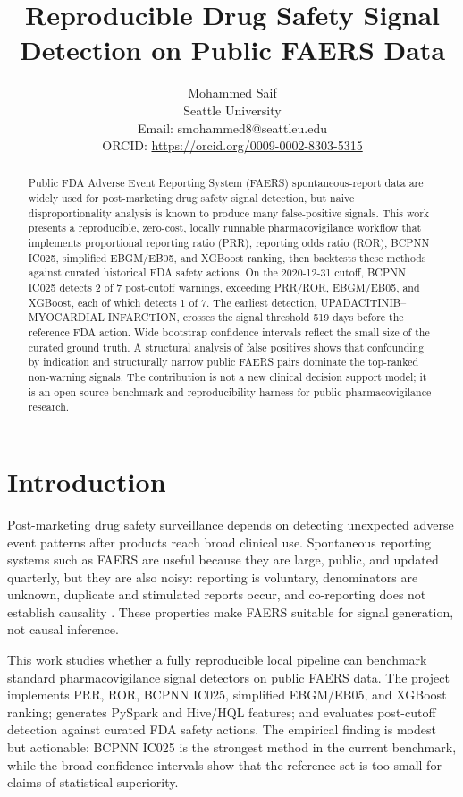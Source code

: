 \documentclass[12pt,onecolumn]{IEEEtran}
\title{Reproducible Drug Safety Signal Detection on Public FAERS Data}
\author{Mohammed Saif\\
Seattle University\\
Email: smohammed8@seattleu.edu\\
ORCID: \url{https://orcid.org/0009-0002-8303-5315}}
\begin{document}
\maketitle

\begin{abstract}
Public FDA Adverse Event Reporting System (FAERS) spontaneous-report data are
widely used for post-marketing drug safety signal detection, but naive
disproportionality analysis is known to produce many false-positive signals.
This work presents a reproducible, zero-cost, locally runnable
pharmacovigilance workflow that implements proportional reporting ratio (PRR),
reporting odds ratio (ROR), BCPNN IC025, simplified EBGM/EB05, and XGBoost
ranking, then backtests these methods against curated historical FDA safety
actions. On the 2020-12-31 cutoff, BCPNN IC025 detects 2 of 7 post-cutoff
warnings, exceeding PRR/ROR, EBGM/EB05, and XGBoost, each of which detects 1 of
7. The earliest detection, UPADACITINIB--MYOCARDIAL INFARCTION, crosses the
signal threshold 519 days before the reference FDA action. Wide bootstrap
confidence intervals reflect the small size of the curated ground truth. A
structural analysis of false positives shows that confounding by indication and
structurally narrow public FAERS pairs dominate the top-ranked non-warning
signals. The contribution is not a new clinical decision support model; it is an
open-source benchmark and reproducibility harness for public pharmacovigilance
research.
\end{abstract}

\section{Introduction}
Post-marketing drug safety surveillance depends on detecting unexpected adverse
event patterns after products reach broad clinical use. Spontaneous reporting
systems such as FAERS are useful because they are large, public, and updated
quarterly, but they are also noisy: reporting is voluntary, denominators are
unknown, duplicate and stimulated reports occur, and co-reporting does not
establish causality \cite{hauben2009review,bate2009quantitative,sakaeda2013faers}.
These properties make FAERS suitable for signal generation, not causal
inference.

This work studies whether a fully reproducible local pipeline can benchmark
standard pharmacovigilance signal detectors on public FAERS data. The project
implements PRR, ROR, BCPNN IC025, simplified EBGM/EB05, and XGBoost ranking;
generates PySpark and Hive/HQL features; and evaluates post-cutoff detection
against curated FDA safety actions. The empirical finding is modest but
actionable: BCPNN IC025 is the strongest method in the current benchmark, while
the broad confidence intervals show that the reference set is too small for
claims of statistical superiority.
\end{document}
